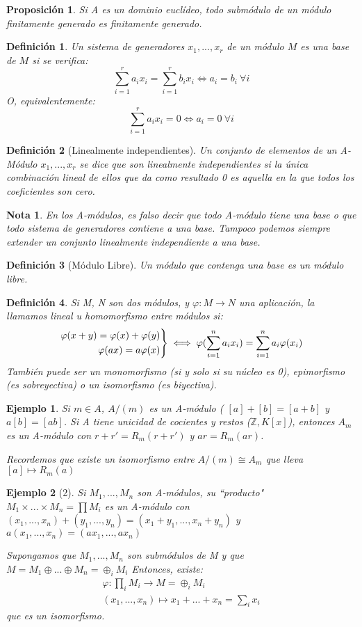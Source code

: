 \documentclass[11pt, a4paper, titlepage]{article}
\newif\IfInSansMode
\providecommand{\ent}{\mathbb{Z}}
\theoremstyle{theorem-style}
\newtheorem{nprop}{Proposición}[section]
\theoremstyle{definition-style}
\newtheorem{ndef}{Definición}[section]
\theoremstyle{remark-style}
\newtheorem*{nota}{Nota}
\theoremstyle{example-style}
\newtheorem{ejemplo}{Ejemplo}[section]
\newenvironment{rcases}
  {\left.\begin{aligned}}
  {\end{aligned}\right\rbrace}
\begin{document}
\begin{nprop}
	Si A es un dominio euclídeo, todo submódulo de un módulo finitamente generado es finitamente generado.
\end{nprop}
\begin{ndef}
	Un sistema de generadores $x_1,...,x_r$ de un módulo $M$ es una base de $M$ si se verifica:
	\[
	\sum_{i=1}^r a_i x_i = \sum_{i=1}^r b_i x_i \iff a_i = b_i \ \forall i
	\]
	O, equivalentemente:
	\[
	\sum_{i=1}^r a_ix_i = 0 \iff a_i  = 0  \ \forall i
	\]
\end{ndef}
\begin{ndef}[Linealmente independientes]
	Un conjunto de elementos de un A-Módulo $x_1,...,x_r$ se dice que son linealmente independientes si la única combinación lineal de ellos que da como resultado 0 es aquella en la que todos los coeficientes son cero.
\end{ndef}
\begin{nota}
	En los A-módulos, es falso decir que todo A-módulo tiene una base o que todo sistema de generadores contiene a una base. Tampoco podemos siempre extender un conjunto linealmente independiente a una base.
\end{nota}
\begin{ndef}[Módulo Libre]
	Un módulo que contenga una base es un módulo libre.
\end{ndef}

\begin{ndef}
	Si M, N son dos módulos, y $\varphi:M \to N$ una aplicación, la llamamos lineal u homomorfismo entre módulos si:
	\[
	\begin{rcases}
	\varphi(x+y) = \varphi(x) + \varphi(y)\\
	\varphi(ax) = a\varphi(x)
\end{rcases} \iff \varphi(\sum_{i=1}^n a_ix_i) = \sum_{i=1}^n a_i \varphi(x_i)
	\]
	También puede ser un monomorfismo (si y solo si su núcleo es 0), epimorfismo (es sobreyectiva) o un isomorfismo (es biyectiva).
\end{ndef}
\begin{ejemplo}
	Si $m\in A$, $A/(m)$ es un A-módulo ( $[a]+[b] = [a+b]$ y $a[b] = [ab]$. Si A tiene unicidad de cocientes y restos ($\ent,K[x]$), entonces $A_m$ es un A-módulo con $r+r' = R_m(r+r')$ y $ar = R_m(ar)$.

	Recordemos que existe un isomorfismo entre $A/(m) \cong A_m$ que lleva $[a] \mapsto R_m(a)$
\end{ejemplo}

\begin{ejemplo}[2]
	Si $M_1,...,M_n$ son A-módulos, su “producto" $M_1 \times ... \times M_n =  \prod M_i$ es un A-módulo con $(x_1,...,x_n) + (y_1,...,y_n) = (x_1+y_1,...,x_n+y_n)$  y $a(x_1,...,x_n)= (ax_1,...,ax_n)$

		Supongamos que $M_1,...,M_n$ son submódulos de M y que $M = M_1 \oplus ... \oplus M_n = \oplus_i M_i$
	Entonces, existe:
	\begin{align}
	\varphi:\prod_i M_i \to M=\oplus_i M_i \\
	(x_1,...,x_n) \mapsto x_1+...+x_n = \sum_i x_i
\end{align}
que es un isomorfismo.
\end{ejemplo}
\end{document}
